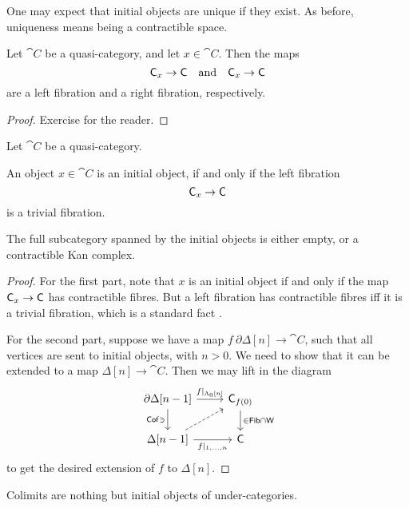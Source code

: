 One may expect that initial objects are unique if they exist.
As before, uniqueness means being a contractible space.

\begin{lemma}
    Let $\cat{C}$ be a quasi-category, and let $x\in\cat{C}$.
    Then the maps 
    \[ \textup{\textsf{C}}_{x\/}\to\textup{\textsf{C}} \quad\text{and}\quad \textup{\textsf{C}}_{\/x}\to\textup{\textsf{C}} \]
    are a left fibration and a right fibration, respectively.
\end{lemma}

\begin{proof}
    Exercise for the reader.
\end{proof}

\begin{proposition}
    Let $\cat C$ be a quasi-category.
    \begin{itms}
        \item An object $x\in\cat C$ is an initial object, if and only if
        the left fibration
        \[ \textup{\textsf{C}}_{x\/}\to\textup{\textsf{C}} \]
        is a trivial fibration.
        \item The full subcategory spanned by the initial objects 
        is either empty, or a contractible Kan complex.
    \end{itms}
\end{proposition}

\begin{proof}
    For the first part, note that $x$ is an initial object 
    if and only if the map $\textup{\textsf{C}}_{x\/}\to\textup{\textsf{C}}$ has contractible fibres.
    But a left fibration has contractible fibres iff
    it is a trivial fibration, which is a standard fact \cite[Lemma~2.1.3.4]{htt}.

    For the second part, suppose we have a map $f\:\partial\Delta[n]\to\cat{C}$,
    such that all vertices are sent to initial objects, with $n>0$.
    We need to show that it can be extended to a map $\Delta[n]\to\cat{C}$.
    Then we may lift in the diagram 
    \[ \begin{tikzcd}
        \partial\Delta[n-1] \ar[d,"\cat{Cof}\ni"'] \ar[r,"f|_{\Lambda_0[n]}"] &
        \cat{C}_{f(0)\/} \ar[d,"\in\cat{Fib}\cap\cat{W}"] \\
        \Delta[n-1] \ar[r,"f|_{1\comma\dotsc\comma n}"'] \ar[ur,dashed] &
        \cat{C}
    \end{tikzcd} \]
    to get the desired extension of $f$ to $\Delta[n]$.
\end{proof}

Colimits are nothing but initial objects of under-categories.

